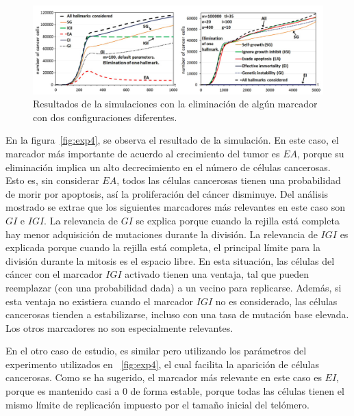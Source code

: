 \begin{figure}[h]
\centering
\includegraphics[scale=0.5]{figures/experiments/exp6}
\caption{Resultados de la simulaciones con la eliminación de algún marcador con dos configuraciones diferentes.}
\label{fig:exp6}
\end{figure}

En la figura~\ref{fig:exp4}, se observa el resultado de la simulación. En este caso, el marcador
más importante de acuerdo al crecimiento del tumor es $EA$,
porque su eliminación implica un alto decrecimiento en el número de células cancerosas.
Esto es, sin considerar $EA$, todos las células cancerosas tienen una probabilidad de morir
por apoptosis, así la proliferación del cáncer disminuye. Del análisis mostrado se extrae
que los siguientes marcadores más relevantes en este caso son $GI$ e $IGI$. La relevancia de $GI$
se explica porque cuando la rejilla está completa hay menor adquisición de mutaciones durante la división.
La relevancia de $IGI$ es explicada porque cuando la rejilla está completa, el principal
límite para la división durante la mitosis es el espacio libre. En esta situación,
las células del cáncer con el marcador $IGI$ activado tienen una ventaja,
tal que pueden reemplazar (con una probabilidad dada) a un vecino para replicarse.
Además, si esta ventaja no existiera cuando el marcador $IGI$ no es considerado, las células
cancerosas tienden a estabilizarse, incluso con una tasa de mutación base elevada.
Los otros marcadores no son especialmente relevantes.

\clearpage

En el otro caso de estudio, es similar pero utilizando los parámetros del experimento utilizados en ~\ref{fig:exp4},
el cual facilita la aparición de células cancerosas. Como se ha sugerido, el marcador más relevante en este caso
es $EI$, porque es mantenido casi a $0$ de forma estable, porque todas las células tienen el mismo límite de replicación
impuesto por el tamaño inicial del telómero.
